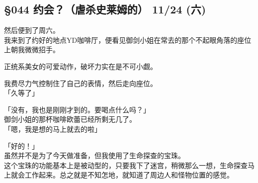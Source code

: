 \subsection{§044 约会？（虐杀史莱姆的） 11/24 (六)}

然后便到了周六。\\

我来到了约好的地点YD咖啡厅，便看见御剑小姐在常去的那个不起眼角落的座位上朝我微微招手。

正统系美女的可爱动作，破坏力实在是不可小觑。

我费尽力气控制住了自己的表情，然后走向座位。\\

「久等了」

「没有，我也是刚刚才到的。要喝点什么吗？」\\

御剑小姐的那杯咖啡欧蕾已经所剩无几了。\\

「嗯，我是想的马上就去的啦」

「好的！」\\

虽然并不是为了今天做准备，但我使用了生命探查的宝珠。\\

这个宝珠的功能基本上是被动型的，只要我下了迷宫，稍微那么一想，生命探查马上就会工作起来。总之就是不知怎地，就知道了周边人和怪物位置的感觉。\\

